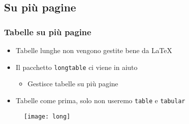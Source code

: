 \subsection{Su più pagine}
\begin{frame}
 \frametitle{Tabelle su più pagine}

 \begin{itemize}
  \item Tabelle lunghe non vengono gestite bene da \LaTeX
  \item Il pacchetto \texttt{longtable} ci viene in aiuto
  \begin{itemize}
   \item Gestisce tabelle su più pagine
  \end{itemize}

  \item Tabelle come prima, solo non useremo \texttt{table} e \texttt{tabular}
 \end{itemize}
  
 \begin{figure}[H]
  \centering
  \texttt{[image: long]}
 \end{figure}

\end{frame}
